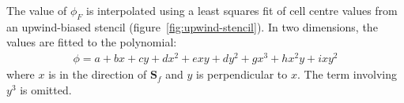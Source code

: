 \documentclass{article}
\begin{document}
The value of $\phi_F$ is interpolated using a least squares fit of cell centre values from an upwind-biased stencil (figure~\ref{fig:upwind-stencil}).  In two dimensions, the values are fitted to the polynomial:
\begin{align}
	\phi = a + bx + cy + dx^2 + exy + dy^2 + gx^3 + h x^2 y + i x y^2
\end{align}
where $x$ is in the direction of $\mathbf{S}_f$ and $y$ is perpendicular to $x$.  The term involving $y^3$ is omitted.




\end{document}
